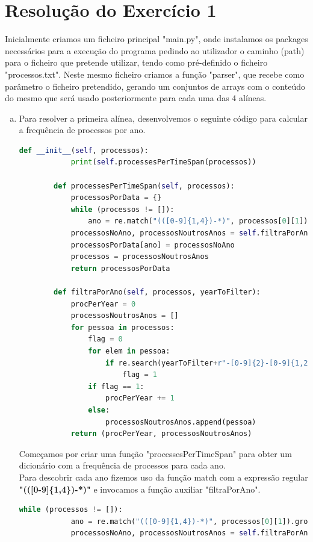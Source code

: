 \documentclass[11pt,a4paper]{report}%
\begin{document}
\chapter{Resolução do Exercício 1}

Inicialmente criamos um ficheiro principal "main.py", onde instalamos os packages necessários para a execução do programa pedindo ao utilizador o caminho (path) para o ficheiro que pretende utilizar, tendo como pré-definido o ficheiro "processos.txt".
Neste mesmo ficheiro criamos a função "parser", que recebe como parâmetro o ficheiro pretendido, gerando um conjuntos de arrays com o conteúdo do mesmo que será usado posteriormente para cada uma das 4 alíneas.

\begin{enumerate}[a)]
	\item Para resolver a primeira alínea, desenvolvemos o seguinte código para calcular a frequência de processos por ano.
	\begin{lstlisting}[language=python]
		def __init__(self, processos):
			print(self.processesPerTimeSpan(processos))
		
		def processesPerTimeSpan(self, processos):
			processosPorData = {}
			while (processos != []):
				ano = re.match("(([0-9]{1,4})-*)", processos[0][1]).group(2)
			processosNoAno, processosNoutrosAnos = self.filtraPorAno(processos, ano)
			processosPorData[ano] = processosNoAno
			processos = processosNoutrosAnos
			return processosPorData
		
		def filtraPorAno(self, processos, yearToFilter):
			procPerYear = 0
			processosNoutrosAnos = []
			for pessoa in processos:
				flag = 0
				for elem in pessoa:
					if re.search(yearToFilter+r"-[0-9]{2}-[0-9]{1,2}", elem):
						flag = 1
				if flag == 1:
					procPerYear += 1
				else:
					processosNoutrosAnos.append(pessoa)
			return (procPerYear, processosNoutrosAnos)
	\end{lstlisting}
	
	Começamos por criar uma função "processesPerTimeSpan" para obter um dicionário com  a frequência de processos para cada ano.\\
	Para descobrir cada ano fizemos uso da função match com a expressão regular \textbf{"(([0-9]\{1,4\})-*)"} e invocamos a função auxiliar "filtraPorAno".
	\begin{lstlisting}[language=python]
		while (processos != []):
			ano = re.match("(([0-9]{1,4})-*)", processos[0][1]).group(2)
			processosNoAno, processosNoutrosAnos = self.filtraPorAno(processos, ano)
	\end{lstlisting}
	

\end{enumerate}
\end{document}

